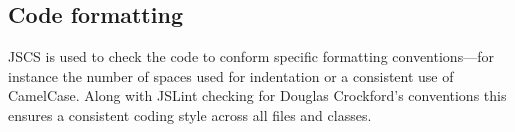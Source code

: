 


\subsection{Code formatting}

JSCS is used to check the code to conform specific formatting conventions---for instance the number of spaces used for indentation or a consistent use of CamelCase. Along with JSLint checking for Douglas Crockford's conventions this ensures a consistent coding style across all files and classes.






